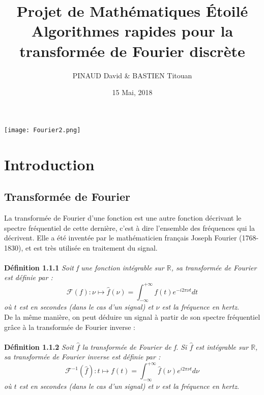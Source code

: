 \documentclass[12pt]{article}
\title{Projet de Mathématiques Étoilé\\
\bigbreak\textbf{Algorithmes rapides pour la transformée de Fourier discrète}}
\author{PINAUD David \& BASTIEN Titouan}
\date{15 Mai, 2018}
\affil{Université Paris Descartes}
\begin{document}
\maketitle
\hspace*{2.8cm}\texttt{[image: Fourier2.png]}
\renewcommand{\contentsname}{Table des Matières}
\pagebreak
\tableofcontents
\pagebreak
\section{Introduction}
\subsection{Transformée de Fourier}
La transformée de Fourier d'une fonction est une autre fonction décrivant le spectre fréquentiel de cette dernière, c'est à dire l'ensemble des fréquences qui la décrivent. Elle a été inventée par le mathématicien français Joseph Fourier (1768-1830), et est très utilisée en traitement du signal. \\\\
\boldmath
\textbf{Définition 1.1.1}
\textit{Soit f une fonction intégrable sur $\mathbb{R}$, sa transformée de Fourier est définie par :}
\begin{equation}
\mathcal{F}(f):\nu\mapsto \hat{f}(\nu)=\int_{-\infty}^{+\infty}f(t)e^{-i2\pi\nu t}dt
\end{equation}
\textit{où $t$ est en secondes (dans le cas d'un signal) et $\nu$ est la fréquence en hertz.}\\

De la même manière, on peut déduire un signal à partir de son spectre fréquentiel grâce à la transformée de Fourier inverse :\\\\
\textbf{Définition 1.1.2}
\textit{Soit \(\hat{f}\) la transformée de Fourier de f. Si \(\hat{f}\) est intégrable sur $\mathbb{R}$, sa transformée de Fourier inverse est définie par : }
\begin{equation}
\mathcal{F}^{-1}(\hat{f}):t\mapsto f(t)=\int_{-\infty}^{+\infty}\hat{f}(\nu)e^{i2\pi\nu t}d\nu
\end{equation}
\textit{où $t$ est en secondes (dans le cas d'un signal) et $\nu$ est la fréquence en hertz.}\\
\end{document}
